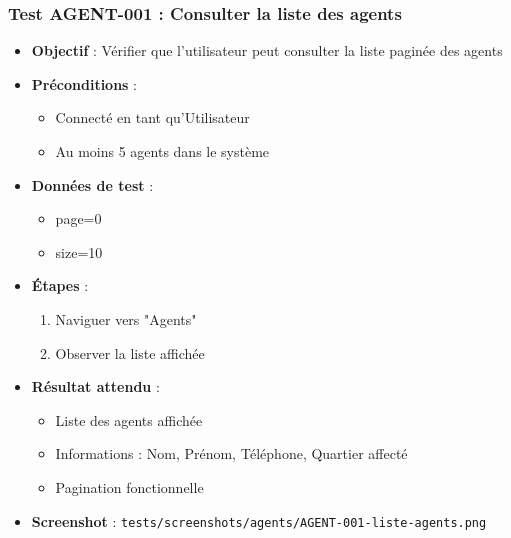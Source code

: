 \subsubsection{Test AGENT-001 : Consulter la liste des agents}
\begin{itemize}
    \item \textbf{Objectif} : Vérifier que l'utilisateur peut consulter la liste paginée des agents
    \item \textbf{Préconditions} : 
        \begin{itemize}
            \item Connecté en tant qu'Utilisateur
            \item Au moins 5 agents dans le système
        \end{itemize}
    \item \textbf{Données de test} :
        \begin{itemize}
            \item page=0
            \item size=10
        \end{itemize}
    \item \textbf{Étapes} :
        \begin{enumerate}
            \item Naviguer vers "Agents"
            \item Observer la liste affichée
        \end{enumerate}
    \item \textbf{Résultat attendu} : 
        \begin{itemize}
            \item Liste des agents affichée
            \item Informations : Nom, Prénom, Téléphone, Quartier affecté
            \item Pagination fonctionnelle
        \end{itemize}
    \item \textbf{Screenshot} : \texttt{tests/screenshots/agents/AGENT-001-liste-agents.png}
\end{itemize}

